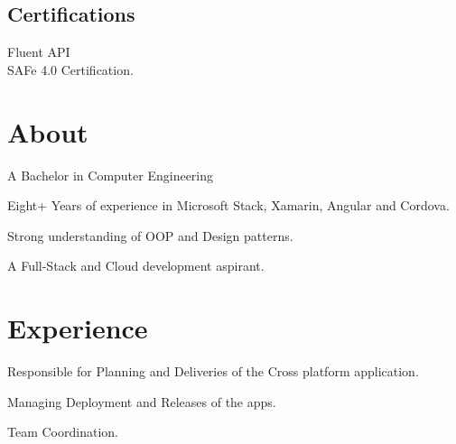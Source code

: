 \documentclass[]{shrikant-resume-openfont}
\begin{document}
\begin{minipage}[t]{0.33\textwidth}
\subsection{Certifications}
\vspace{1mm}
\textbullet{} Fluent API \\
\vspace{1mm}
\textbullet{} SAFe 4.0 Certification. \\

%
%

\end{minipage} 
\hfill
\begin{minipage}[t]{0.66\textwidth} 

\section{About}
\vspace{\topsep}
\begin{tightemize}
\item A Bachelor in Computer Engineering
\item Eight+ Years of experience in Microsoft Stack, Xamarin, Angular and Cordova.
\item Strong understanding of OOP and Design patterns.
\item A Full-Stack and Cloud development aspirant.
\end{tightemize}
\sectionsep

\section{Experience}
\begin{tightemize}
\item Responsible for Planning and Deliveries of the Cross platform application.
\item Managing Deployment and Releases of the apps.
\item Team Coordination.
\end{tightemize}
\sectionsep


\end{minipage}
\end{document}
